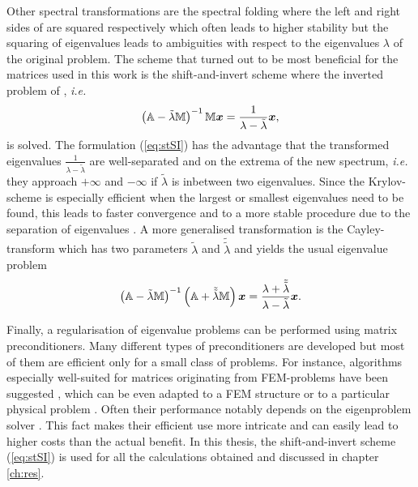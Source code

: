 Other spectral transformations are the spectral folding \cite{slepcManual} where the left and right sides of  are squared respectively which often leads to higher stability but the squaring of eigenvalues leads to ambiguities with respect to the eigenvalues $\lambda$ of the original problem.
The scheme that turned out to be most beneficial for the matrices used in this work is the shift-and-invert scheme where the inverted problem of , \textit{i.e.}
\begin{equation}\label{eq:stSI}
\left(\mathbb{A}-\tilde{\lambda}\mathbb{M}\right)^{-1}\mathbb{M}\bm{x}=\frac{1}{\lambda-\tilde{\lambda}}\bm{x},
\end{equation}
is solved. 
The formulation (\ref{eq:stSI}) has the advantage that the transformed eigenvalues $\frac{1}{\lambda-\tilde{\lambda}}$ are well-separated and on the extrema of the new spectrum, \textit{i.e.} they approach $+\infty$ and $-\infty$ if $\tilde{\lambda}$ is inbetween two eigenvalues.
Since the Krylov-scheme is especially efficient when the largest or smallest eigenvalues need to be found, this leads to faster convergence and to a more stable procedure due to the separation of eigenvalues \cite{str-7}.
A more generalised transformation is the Cayley-transform which has two parameters $\tilde{\lambda}$ and $\tilde{\tilde{\lambda}}$ and yields the usual eigenvalue problem
\begin{equation}
\left(\mathbb{A}-\tilde{\lambda}\mathbb{M}\right)^{-1}\left(\mathbb{A}+\tilde{\tilde{\lambda}}\mathbb{M}\right)\bm{x}=\frac{\lambda+\tilde{\tilde{\lambda}}}{\lambda-\tilde{\lambda}}\bm{x}.
\end{equation}

Finally, a regularisation of eigenvalue problems can be performed using matrix preconditioners.
Many different types of preconditioners are developed \cite{Helmke2010} but most of them are efficient only for a small class of problems.
For instance, algorithms especially well-suited for matrices originating from FEM-problems have been suggested \cite{PrecFem, PrecFem2}, which can be even adapted to a FEM structure \cite{MultPrec,MultPrec2} or to a particular physical problem \cite{HelmhPrec}. 
Often their performance notably depends on the eigenproblem solver \cite{PrecKr}.
This fact makes their efficient use more intricate and can easily lead to higher costs than the actual benefit.
In this thesis, the shift-and-invert scheme (\ref{eq:stSI}) is used for all the calculations obtained and discussed in chapter \ref{ch:res}.

